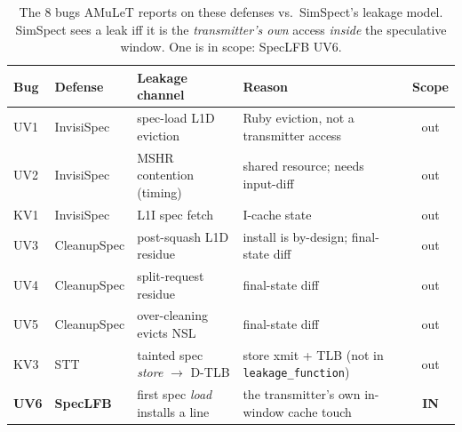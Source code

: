 \documentclass[11pt]{article}
\begin{document}
\begin{table}[p]\centering\small
\renewcommand{\arraystretch}{1.2}
\caption{The 8 bugs AMuLeT reports on these defenses vs.\ SimSpect's leakage model.
SimSpect sees a leak iff it is the \emph{transmitter's own} access \emph{inside} the
speculative window. One is in scope: SpecLFB UV6.}
\label{tab:scope}
\begin{tabular}{@{}llll c@{}}
\toprule
\textbf{Bug} & \textbf{Defense} & \textbf{Leakage channel} & \textbf{Reason} & \textbf{Scope}\\
\midrule
UV1 & InvisiSpec & spec-load L1D eviction & Ruby eviction, not a transmitter access & \textcolor{camulet}{out}\\
UV2 & InvisiSpec & MSHR contention (timing) & shared resource; needs input-diff & \textcolor{camulet}{out}\\
KV1 & InvisiSpec & L1I spec fetch & I-cache state & \textcolor{camulet}{out}\\
UV3 & CleanupSpec & post-squash L1D residue & install is by-design; final-state diff & \textcolor{camulet}{out}\\
UV4 & CleanupSpec & split-request residue & final-state diff & \textcolor{camulet}{out}\\
UV5 & CleanupSpec & over-cleaning evicts NSL & final-state diff & \textcolor{camulet}{out}\\
KV3 & STT & tainted spec \emph{store} $\to$ D-TLB & store xmit + TLB (not in \texttt{leakage\_function}) & \textcolor{camulet}{out}\\
\rowcolor{ctarget!12}
\textbf{UV6} & \textbf{SpecLFB} & first spec \emph{load} installs a line & the transmitter's own in-window cache touch & \textcolor{ctarget}{\textbf{IN}}\\
\bottomrule
\end{tabular}
\end{table}
\end{document}

